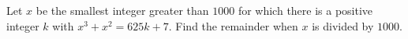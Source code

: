 Let $x$ be the smallest integer greater than $1000$ for which there is a positive integer $k$ with $x^3+x^2=625k+7$. Find the remainder when $x$ is divided by $1000$.
